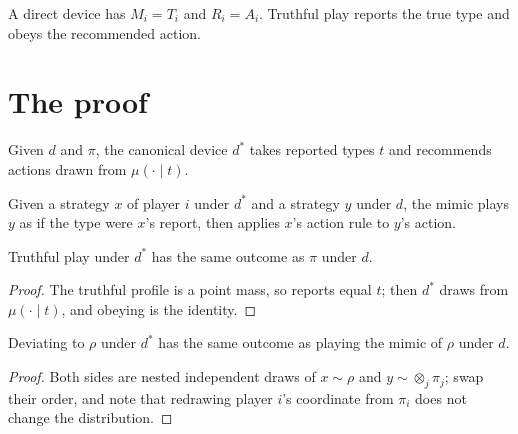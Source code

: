 \begin{definition}
  \label{def:direct}
  \leanok
  A direct device has $M_i = T_i$ and $R_i = A_i$. Truthful play reports the
  true type and obeys the recommended action.
\end{definition}

\section{The proof}

\begin{definition}
  \label{def:canonical}
  \leanok
  Given $d$ and $\pi$, the canonical device $d^*$ takes reported types $t$ and
  recommends actions drawn from $\mu(\cdot \mid t)$.
\end{definition}

\begin{definition}
  \label{def:deviate}
  \leanok
  Given a strategy $x$ of player $i$ under $d^*$ and a strategy $y$ under $d$,
  the mimic plays $y$ as if the type were $x$'s report, then applies $x$'s
  action rule to $y$'s action.
\end{definition}

\begin{lemma}
  \label{lem:truthful}
  \leanok
  Truthful play under $d^*$ has the same outcome as $\pi$ under $d$.
\end{lemma}
\begin{proof}
  The truthful profile is a point mass, so reports equal $t$; then $d^*$
  draws from $\mu(\cdot \mid t)$, and obeying is the identity.
\end{proof}

\begin{lemma}
  \label{lem:deviation}
  \leanok
  Deviating to $\rho$ under $d^*$ has the same outcome as playing the mimic
  of $\rho$ under $d$.
\end{lemma}
\begin{proof}
  Both sides are nested independent draws of $x \sim \rho$ and
  $y \sim \otimes_j \pi_j$; swap their order, and note that redrawing player
  $i$'s coordinate from $\pi_i$ does not change the distribution.
\end{proof}


